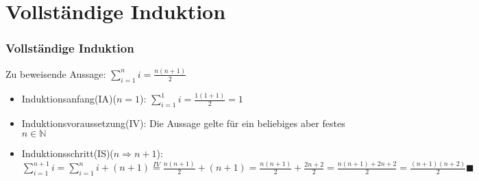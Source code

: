 \section{Vollständige Induktion}
\begin{frame}
    \frametitle{Vollständige Induktion}
    Zu beweisende Aussage: $\sum_{i=1}^{n} i = \frac{n(n+1)}{2}$
    \vfill
    \begin{itemize}
        \vfill \item Induktionsanfang(IA)($n=1$):
                \newline $\sum_{i=1}^{1} i = \frac{1(1+1)}{2} = 1$
        \vfill \item Induktionsvoraussetzung(IV):
                \newline Die Aussage gelte für ein beliebiges aber festes $n \in \mathbb{N}$
        \vfill \item Induktionsschritt(IS)($n \Rightarrow n+1$):
                \newline $\sum_{i=1}^{n+1} i = \sum_{i=1}^{n} i + (n+1) \stackrel{IV}{=} \frac{n(n+1)}{2} + (n+1) = \frac{n(n+1)}{2} + \frac{2n+2}{2} = \frac{n(n+1)+2n+2}{2} = \frac{(n+1)(n+2)}{2} \blacksquare$

    \end{itemize}
\end{frame}
